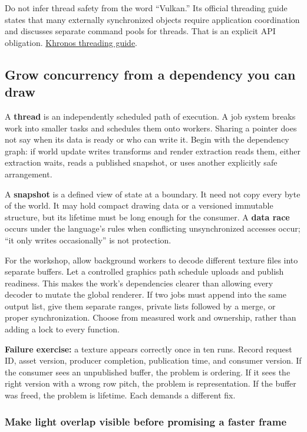 Do not infer thread safety from the word ``Vulkan.'' Its official threading guide states that many externally synchronized objects require application coordination and discusses separate command pools for threads. That is an explicit API obligation. \href{https://docs.vulkan.org/guide/latest/threading.html}{Khronos threading guide}.

\subsection{Grow concurrency from a dependency you can draw}\label{06-engine-ii-ch026-grow-concurrency-from-a-dependency-you-can-draw}

A \textbf{thread} is an independently scheduled path of execution. A job system breaks work into smaller tasks and schedules them onto workers. Sharing a pointer does not say when its data is ready or who can write it. Begin with the dependency graph: if world update writes transforms and render extraction reads them, either extraction waits, reads a published snapshot, or uses another explicitly safe arrangement.

A \textbf{snapshot} is a defined view of state at a boundary. It need not copy every byte of the world. It may hold compact drawing data or a versioned immutable structure, but its lifetime must be long enough for the consumer. A \textbf{data race} occurs under the language's rules when conflicting unsynchronized accesses occur; ``it only writes occasionally'' is not protection.

For the workshop, allow background workers to decode different texture files into separate buffers. Let a controlled graphics path schedule uploads and publish readiness. This makes the work's dependencies clearer than allowing every decoder to mutate the global renderer. If two jobs must append into the same output list, give them separate ranges, private lists followed by a merge, or proper synchronization. Choose from measured work and ownership, rather than adding a lock to every function.

\textbf{Failure exercise:} a texture appears correctly once in ten runs. Record request ID, asset version, producer completion, publication time, and consumer version. If the consumer sees an unpublished buffer, the problem is ordering. If it sees the right version with a wrong row pitch, the problem is representation. If the buffer was freed, the problem is lifetime. Each demands a different fix.

\subsubsection{Make light overlap visible before promising a faster frame}\label{06-engine-ii-ch026-make-light-overlap-visible-before-promising-a-faster-frame}

